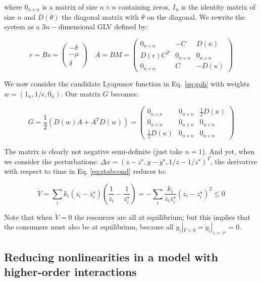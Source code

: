 \documentclass{article}
\begin{document}
where \(0_{n \times n}\) is a matrix of size \(n \times n\) containing
zeros, \(I_n\) is the identity matrix of size \(n\) and \(D(\theta)\)
the diagonal matrix with \(\theta\) on the diagonal. We rewrite the
system as a \(3n-\)dimensional GLV defined by:

\begin{equation}
r = B s = \begin{pmatrix}
-\delta \\
-\mu \\
\delta
\end{pmatrix} \quad
A = B M = \begin{pmatrix}
0_{n \times n} & -C & D(\kappa)\\
D(\epsilon) C^T & 0_{n \times n} & 0_{n \times n}\\
0_{n \times n} & C & -D(\kappa)
\end{pmatrix}
\end{equation}

We now consider the candidate Lyapunov function in Eq. \ref{eq:goh} with
weights \(w = (1_n, 1 / \epsilon, 0_n)\). Our matrix \(G\) becomes:

\begin{equation}
G = \frac{1}{2}(D(w) A + A^T D(w)) = \begin{pmatrix}
0_{n \times n} & 0_{n \times n} & \frac{1}{2} D(\kappa)\\
0_{n \times n} & 0_{n \times n} & 0_{n \times n}\\
\frac{1}{2} D(\kappa) & 0_{n \times n} & 0_{n \times n}
\end{pmatrix}
\end{equation}

The matrix is clearly not negative semi-definite (just take \(n = 1\)).
And yet, when we consider the perturbations:
\(\Delta x = (z - z^\star, y - y^\star, 1 / z - 1 / z^\star)^T\), the
derivative with respect to time in Eq. \ref{eq:stabcond} reduces to:

\begin{equation}
\dot{V} = \sum_i k_i (z_i - z_i^\star) \left( \frac{1}{z_i} - \frac{1}{z_i^\star} \right) = - \sum_i \frac{k_i}{z_i z_i^\star} (z_i - z_i^\star)^2 \leq 0
\end{equation}

Note that when \(\dot{V} = 0\) the resources are all at equilibrium; but
this implies that the consumers must also be at equilibrium, because all
\(\dot{y}_i|_{\dot{V} = 0} = \dot{y}_i|_{z = z^\star} = 0\).

\hypertarget{reducing-nonlinearities-in-a-model-with-higher-order-interactions}{%
\subsection{Reducing nonlinearities in a model with higher-order
interactions}\label{reducing-nonlinearities-in-a-model-with-higher-order-interactions}}
\end{document}
